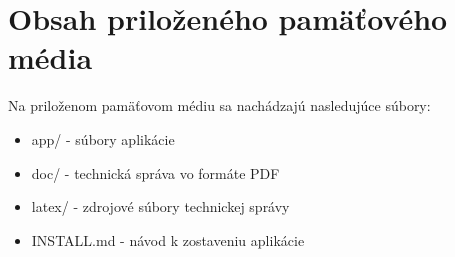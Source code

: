 \chapter{Obsah priloženého pamäťového média}
\label{cd}
Na priloženom pamäťovom médiu sa nachádzajú nasledujúce súbory:
\begin{itemize}
  \item{app/ - súbory aplikácie}
  \item{doc/ - technická správa vo formáte PDF}
  \item{latex/ - zdrojové súbory technickej správy}
  \item{INSTALL.md - návod k zostaveniu aplikácie}
\end{itemize}